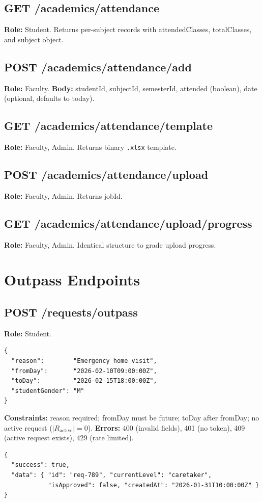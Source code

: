 \documentclass[12pt,a4paper]{report}
\newcommand{\code}[1]{\texttt{#1}}
\begin{document}
\subsection{GET /academics/attendance}
\textbf{Role:} Student. Returns per-subject records with attendedClasses, totalClasses, and subject object.

\subsection{POST /academics/attendance/add}
\textbf{Role:} Faculty. \textbf{Body:} studentId, subjectId, semesterId, attended (boolean), date (optional, defaults to today).

\subsection{GET /academics/attendance/template} \textbf{Role:} Faculty, Admin. Returns binary \code{.xlsx} template.

\subsection{POST /academics/attendance/upload} \textbf{Role:} Faculty, Admin. Returns jobId.

\subsection{GET /academics/attendance/upload/progress} \textbf{Role:} Faculty, Admin. Identical structure to grade upload progress.

\section{Outpass Endpoints}

\subsection{POST /requests/outpass}
\textbf{Role:} Student.
\begin{lstlisting}[caption={Outpass submission},label={lst:outpassreq}]
{
  "reason":        "Emergency home visit",
  "fromDay":       "2026-02-10T09:00:00Z",
  "toDay":         "2026-02-15T18:00:00Z",
  "studentGender": "M"
}
\end{lstlisting}
\textbf{Constraints:} reason required; fromDay must be future; toDay after fromDay; no active request ($|R_{\text{active}}| = 0$). \textbf{Errors:} 400 (invalid fields), 401 (no token), 409 (active request exists), 429 (rate limited).
\begin{lstlisting}[caption={Outpass response},label={lst:outpassres}]
{
  "success": true,
  "data": { "id": "req-789", "currentLevel": "caretaker",
            "isApproved": false, "createdAt": "2026-01-31T10:00:00Z" }
}
\end{lstlisting}
\end{document}
